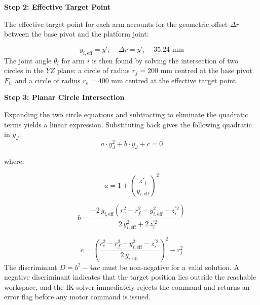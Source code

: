 \par\noindent\textbf{Step 2: Effective Target Point}\par
\hspace{1.27cm}
The effective target point for each arm accounts for the geometric offset $\Delta r$
between the base pivot and the platform joint:

\begin{equation}
    y_{i,\text{eff}} = y'_i - \Delta r = y'_i - 35.24 \text{ mm}
    \label{eq:eff_target}
\end{equation}
\hspace{1.27cm}
The joint angle $\theta_i$ for arm $i$ is then found by solving the intersection of two
circles in the $YZ$ plane: a circle of radius $r_f = 200$ mm centred at the base pivot
$F_i$, and a circle of radius $r_e = 400$ mm centred at the effective target point.

\par\noindent\textbf{Step 3: Planar Circle Intersection}\par
\hspace{1.27cm}
Expanding the two circle equations and subtracting to eliminate the quadratic terms
yields a linear expression. Substituting back gives the following quadratic in $y_J$:
\begin{equation}
    a \cdot y_J^2 + b \cdot y_J + c = 0
    \label{eq:quadratic}
\end{equation}

where:

\begin{equation}
    a = 1 + \left(\frac{z'_i}{y_{i,\text{eff}}}\right)^2
    \label{eq:coeff_a}
\end{equation}

\begin{equation}
    b = \frac{-2 \, y_{i,\text{eff}} \left(r_e^2 - r_f^2 - y_{i,\text{eff}}^2 - z_i^{\prime 2}\right)}
            {2\, y_{i,\text{eff}}^2 + 2\, z_i^{\prime 2}}
    \label{eq:coeff_b}
\end{equation}

\begin{equation}
    c = \left(\frac{r_e^2 - r_f^2 - y_{i,\text{eff}}^2 - z_i^{\prime 2}}
                   {2\, y_{i,\text{eff}}}\right)^2 - r_f^2
    \label{eq:coeff_c}
\end{equation}
\hspace{1.27cm}
The discriminant $D = b^2 - 4ac$ must be non-negative for a valid solution. A negative
discriminant indicates that the target position lies outside the reachable workspace, and
the IK solver immediately rejects the command and returns an error flag before any motor
command is issued.

